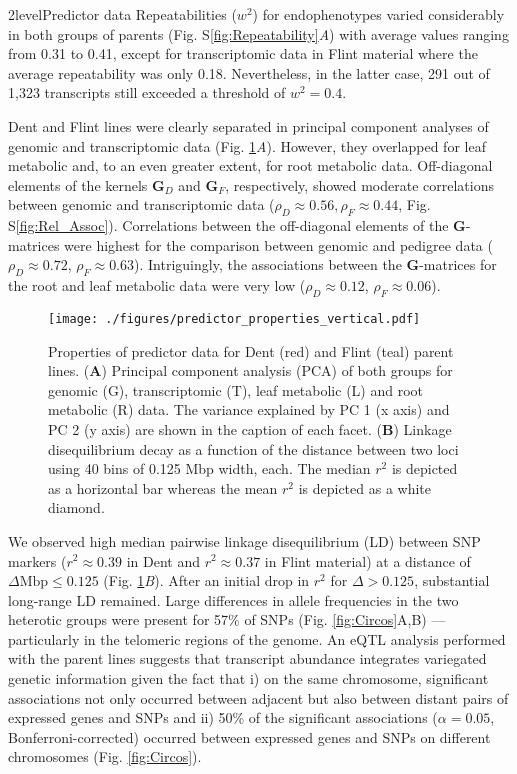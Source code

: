 \documentclass[12pt,titlepage]{article}
\begin{document}
\Genetics2level{Predictor data}
Repeatabilities ($w^{2}$) for endophenotypes varied considerably in both groups
of parents (Fig. S\ref{fig:Repeatability}\textit{A}) with average values
ranging from 0.31 to 0.41, except for transcriptomic data in Flint material 
where the average repeatability was only 0.18.
Nevertheless, in the latter case, 291 out of 1,323 transcripts still
exceeded a threshold of $w^{2} = 0.4$.

Dent and Flint lines were clearly separated in principal component analyses of 
genomic and transcriptomic data (Fig. \ref{fig:PredictorProperties}\textit{A}).
However, they overlapped for leaf metabolic and, to an even greater extent, for
root metabolic data.
Off-diagonal elements of the kernels $\mathbf{G}_{D}$ and $\mathbf{G}_{F}$, 
respectively, showed moderate correlations between genomic and transcriptomic 
data ($\rho_{D} \approx 0.56, \rho_{F} \approx 0.44$, 
Fig. S\ref{fig:Rel_Assoc}). 
Correlations between the off-diagonal elements of the $\mathbf{G}$-matrices were 
highest for the comparison between genomic and pedigree data 
($\rho_{D} \approx 0.72$, $\rho_{F} \approx 0.63$).
Intriguingly, the associations between the $\mathbf{G}$-matrices for the root
and leaf metabolic data were very low ($\rho_{D} \approx 0.12$,
$\rho_{F} \approx 0.06$).

\begin{figure}[H]
\centering
\texttt{[image: ./figures/predictor\_properties\_vertical.pdf]}
\caption{
  Properties of predictor data for Dent (red) and Flint (teal)
  parent lines.
  (\textbf{A}) Principal component analysis (PCA) of both
  groups for genomic (G), transcriptomic (T), leaf metabolic (L) and root
  metabolic (R) data. The variance explained by PC 1 (x axis) and PC 2 (y
  axis) are shown in the caption of each facet.
  (\textbf{B}) Linkage disequilibrium decay as a function of the distance
  between two loci using 40 bins of 0.125 Mbp width, each.
  The median $r^2$ is depicted as a horizontal bar whereas the mean $r^2$ is 
  depicted as a white diamond.
  }
\label{fig:PredictorProperties}
\end{figure}


We observed high median pairwise linkage disequilibrium (LD) between
SNP markers ($r^{2} \approx 0.39$ in Dent and $r^{2} \approx 0.37$ in Flint 
material) at a distance of $\Delta \text{Mbp} \leq 0.125$ 
(Fig. \ref{fig:PredictorProperties}\textit{B}). 
After an initial drop in $r^{2}$ for $\Delta > 0.125$, substantial long-range
LD remained.
Large differences in allele frequencies in the two heterotic groups were 
present for 57\% of SNPs (Fig. \ref{fig:Circos}A,B) --- particularly in the 
telomeric regions of the genome.
An eQTL analysis performed with the parent lines suggests that transcript 
abundance integrates variegated genetic information given the fact that i) on 
the same chromosome, significant associations not only occurred between 
adjacent but also between distant pairs of expressed genes and SNPs and ii) 50\% 
of the significant associations ($\alpha = 0.05$, Bonferroni-corrected) occurred
between expressed genes and SNPs on different chromosomes
(Fig. \ref{fig:Circos}).
\end{document}

